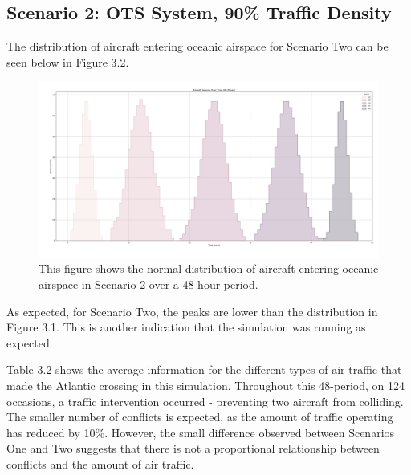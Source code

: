 \documentclass[stu, a4paper, 12pt, floatsintext]{apa7}
\numberwithin{figure}{section}
\numberwithin{table}{section}
\numberwithin{equation}{section}
\begin{document}
\subsection{Scenario 2: OTS System, 90\% Traffic Density}
The distribution of aircraft entering oceanic airspace for Scenario Two can be seen below in Figure 3.2.

\begin{figure}[H]
    \caption{This figure shows the normal distribution of aircraft entering oceanic airspace in Scenario 2 over a 48 hour period.}
    \label{fig:3.2}
    \centering
    \includegraphics[width=1.1\textwidth]{pictures/Figure 3.2.png}    
\end{figure}

As expected, for Scenario Two, the peaks are lower than the distribution in Figure 3.1. This is another indication that the simulation was running as expected. 

Table 3.2 shows the average information for the different types of air traffic that made the Atlantic crossing in this simulation. Throughout this 48-period, on 124 occasions, a traffic intervention occurred - preventing two aircraft from colliding. The smaller number of conflicts is expected, as the amount of traffic operating has reduced by 10\%. However, the small difference observed between Scenarios One and Two suggests that there is not a proportional relationship between conflicts and the amount of air traffic.
\end{document}
